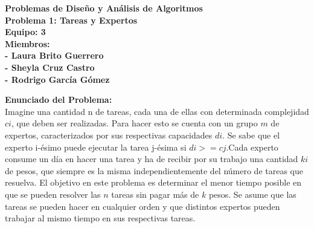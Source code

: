 \documentclass[10pt,letterpaper]{article}
\begin{document}
 	\Large{

 	\begin{center}
 		
 		 {\Huge \bf Problemas de Dise\~no y An\'alisis de Algoritmos}\\
 		 \vspace{1cm}
 		 {\Huge \bf Problema 1: Tareas y Expertos }\\ 
 		 \vspace{1cm}
 		 {\Large \bf Equipo: 3}\\
 		 \vspace{0.5cm}
 		 {\Large \bf Miembros:}\\
 		 {\bf - Laura Brito Guerrero}\\
 		 {\bf - Sheyla Cruz Castro}\\	
 		 {\bf - Rodrigo Garc\'ia G\'omez}\\
 		 
 	\end{center}
 	
 	{\Large \bf Enunciado del Problema:}\\
 	
 	Imagine una cantidad n de tareas, cada una de ellas con determinada complejidad $ci$, que deben ser realizadas. Para hacer esto se cuenta con un grupo $m $ de expertos, caracterizados por sus respectivas capacidades $di$. Se sabe que el experto i-\'esimo puede ejecutar la tarea j-\'esima si $di>= cj$.Cada experto consume un d\'ia en hacer una tarea y ha de recibir por su trabajo una cantidad $ki$ de pesos, que siempre es la misma independientemente del n\'umero de tareas que resuelva. El objetivo en este problema es determinar el menor tiempo posible en que se
 	pueden resolver las $n$ tareas sin pagar m\'as de $k$ pesos. Se asume que las tareas se pueden hacer en cualquier orden y que distintos expertos pueden trabajar al mismo tiempo en sus respectivas tareas.
 	\\ \\
 	
}
\end{document}
